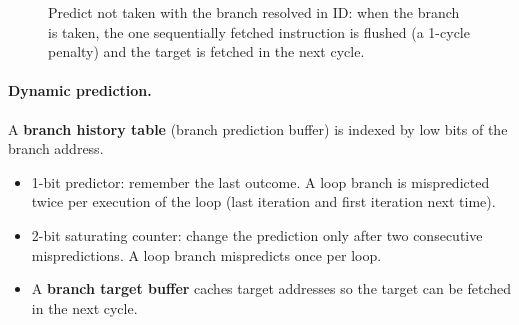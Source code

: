 \begin{figure}[H]
\centering
{}
\caption{Predict not taken with the branch resolved in ID: when the branch
is taken, the one sequentially fetched instruction is flushed (a 1-cycle
penalty) and the target is fetched in the next cycle.}
\end{figure}

\paragraph{Dynamic prediction.} A \textbf{branch history table} (branch
prediction buffer) is indexed by low bits of the branch address.
\begin{itemize}
  \item 1-bit predictor: remember the last outcome. A loop branch is
    mispredicted twice per execution of the loop (last iteration and first
    iteration next time).
  \item 2-bit saturating counter: change the prediction only after two
    consecutive mispredictions. A loop branch mispredicts once per loop.
  \item A \textbf{branch target buffer} caches target addresses so the
    target can be fetched in the next cycle.
\end{itemize}

